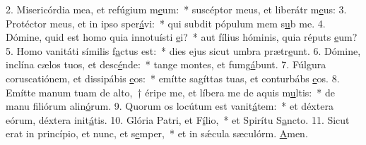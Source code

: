 2. Misericórdia mea, et refúgium m\uline{e}um:~* suscéptor meus, et liberátr m\uline{e}us:
3. Protéctor meus, et in ipso sper\uline{á}vi:~* qui subdit pópulum mem s\uline{u}b me.
4. Dómine, quid est homo quia innotuísti \uline{e}i?~* aut fílius hóminis, quia réputs \uline{e}um?
5. Homo vanitáti símilis f\uline{a}ctus est:~* dies ejus sicut umbra prætr\uline{e}unt.
6. Dómine, inclína cælos tuos, et desc\uline{é}nde:~* tange montes, et fumg\uline{á}bunt.
7. Fúlgura coruscatiónem, et dissipábis \uline{e}os:~* emítte sagíttas tuas, et conturbábs \uline{e}os.
8. Emítte manum tuam de alto,~† éripe me, et líbera me de aquis m\uline{u}ltis:~* de manu filiórum alin\uline{ó}rum.
9. Quorum os locútum est vanit\uline{á}tem:~* et déxtera eórum, déxtera init\uline{á}tis.
10. Glória Patri, et F\uline{í}lio,~* et Spirítu S\uline{a}ncto.
11. Sicut erat in princípio, et nunc, et s\uline{e}mper,~* et in sǽcula sæculórm. \uline{A}men.
